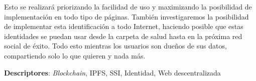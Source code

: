 \documentclass[a4paper,openright,11pt]{book}
\begin{document}
Esto se realizará priorizando la facilidad de uso y maximizando la posibilidad de implementación en todo tipo de páginas. También investigaremos la posibilidad de implementar esta identificación a todo Internet, haciendo posible que estas identidades se puedan usar desde la carpeta de salud hasta en la próxima red social de éxito. Todo esto mientras los usuarios son dueños de sus datos, compartiendo solo lo que quieren y nada más.

\textbf{Descriptores}:
\textit{Blockchain}, IPFS, SSI, Identidad, Web descentralizada

\newpage
\thispagestyle{empty}

{
}

\tableofcontents

\cleardoublepage

\listoffigures
\cleardoublepage

\listoftables

\mainmatter

\pagestyle{fancy}

\lhead{}
\end{document}
